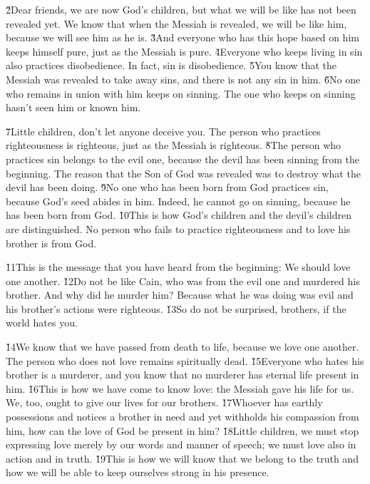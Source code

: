 \v{2}Dear friends, we are now God's children, but what we will be like has not been revealed yet. We know that when the Messiah is revealed, we will be like him, because we will see him as he is. \v{3}And everyone who has this hope based on him keeps himself pure, just as the Messiah is pure. \v{4}Everyone who keeps living in sin also practices disobedience. In fact, sin is disobedience. \v{5}You know that the Messiah was revealed to take away sins, and there is not any sin in him. \v{6}No one who remains in union with him keeps on sinning. The one who keeps on sinning hasn't seen him or known him.

\v{7}Little children, don't let anyone deceive you. The person who practices righteousness is righteous, just as the Messiah is righteous. \v{8}The person who practices sin belongs to the evil one, because the devil has been sinning from the beginning. The reason that the Son of God was revealed was to destroy what the devil has been doing. \v{9}No one who has been born from God practices sin, because God's seed abides in him. Indeed, he cannot go on sinning, because he has been born from God. \v{10}This is how God's children and the devil's children are distinguished. No person who fails to practice righteousness and to love his brother is from God.

\v{11}This is the message that you have heard from the beginning: We should love one another. \v{12}Do not be like Cain, who was from the evil one and murdered his brother. And why did he murder him? Because what he was doing was evil and his brother's actions were righteous. \v{13}So do not be surprised, brothers, if the world hates you.

\v{14}We know that we have passed from death to life, because we love one another. The person who does not love remains spiritually dead. \v{15}Everyone who hates his brother is a murderer, and you know that no murderer has eternal life present in him. \v{16}This is how we have come to know love: the Messiah gave his life for us. We, too, ought to give our lives for our brothers. \v{17}Whoever has earthly possessions and notices a brother in need and yet withholds his compassion from him, how can the love of God be present in him? \v{18}Little children, we must stop expressing love merely by our words and manner of speech; we must love also in action and in truth. \v{19}This is how we will know that we belong to the truth and how we will be able to keep ourselves strong in his presence.

